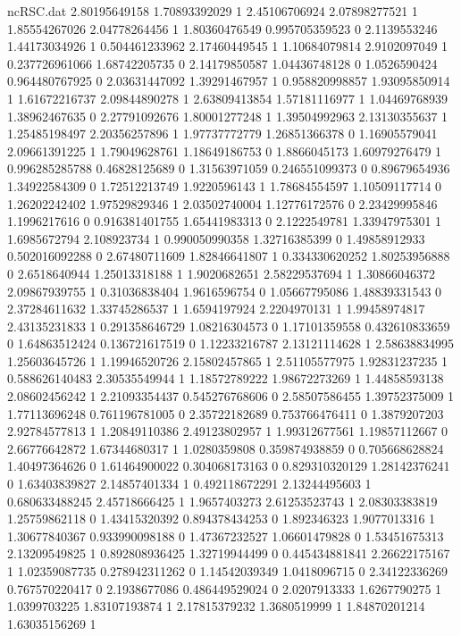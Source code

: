 \begin{filecontents}{ncRSC.dat}
2.80195649158 1.70893392029 1
2.45106706924 2.07898277521 1
1.85554267026 2.04778264456 1
1.80360476549 0.995705359523 0
2.1139553246 1.44173034926 1
0.504461233962 2.17460449545 1
1.10684079814 2.9102097049 1
0.237726961066 1.68742205735 0
2.14179850587 1.04436748128 0
1.0526590424 0.964480767925 0
2.03631447092 1.39291467957 1
0.958820998857 1.93095850914 1
1.61672216737 2.09844890278 1
2.63809413854 1.57181116977 1
1.04469768939 1.38962467635 0
2.27791092676 1.80001277248 1
1.39504992963 2.13130355637 1
1.25485198497 2.20356257896 1
1.97737772779 1.26851366378 0
1.16905579041 2.09661391225 1
1.79049628761 1.18649186753 0
1.8866045173 1.60979276479 1
0.996285285788 0.46828125689 0
1.31563971059 0.246551099373 0
0.89679654936 1.34922584309 0
1.72512213749 1.9220596143 1
1.78684554597 1.10509117714 0
1.26202242402 1.97529829346 1
2.03502740004 1.12776172576 0
2.23429995846 1.1996217616 0
0.916381401755 1.65441983313 0
2.1222549781 1.33947975301 1
1.6985672794 2.108923734 1
0.990050990358 1.32716385399 0
1.49858912933 0.502016092288 0
2.67480711609 1.82846641807 1
0.334330620252 1.80253956888 0
2.6518640944 1.25013318188 1
1.9020682651 2.58229537694 1
1.30866046372 2.09867939755 1
0.31036838404 1.9616596754 0
1.05667795086 1.48839331543 0
2.37284611632 1.33745286537 1
1.6594197924 2.2204970131 1
1.99458974817 2.43135231833 1
0.291358646729 1.08216304573 0
1.17101359558 0.432610833659 0
1.64863512424 0.136721617519 0
1.12233216787 2.13121114628 1
2.58638834995 1.25603645726 1
1.19946520726 2.15802457865 1
2.51105577975 1.92831237235 1
0.588626140483 2.30535549944 1
1.18572789222 1.98672273269 1
1.44858593138 2.08602456242 1
2.21093354437 0.545276768606 0
2.58507586455 1.39752375009 1
1.77113696248 0.761196781005 0
2.35722182689 0.753766476411 0
1.3879207203 2.92784577813 1
1.20849110386 2.49123802957 1
1.99312677561 1.19857112667 0
2.66776642872 1.67344680317 1
1.0280359808 0.359874938859 0
0.705668628824 1.40497364626 0
1.61464900022 0.304068173163 0
0.829310320129 1.28142376241 0
1.63403839827 2.14857401334 1
0.492118672291 2.13244495603 1
0.680633488245 2.45718666425 1
1.9657403273 2.61253523743 1
2.08303383819 1.25759862118 0
1.43415320392 0.894378434253 0
1.892346323 1.9077013316 1
1.30677840367 0.933990098188 0
1.47367232527 1.06601479828 0
1.53451675313 2.13209549825 1
0.892808936425 1.32719944499 0
0.445434881841 2.26622175167 1
1.02359087735 0.278942311262 0
1.14542039349 1.0418096715 0
2.34122336269 0.767570220417 0
2.1938677086 0.486449529024 0
2.0207913333 1.6267790275 1
1.0399703225 1.83107193874 1
2.17815379232 1.3680519999 1
1.84870201214 1.63035156269 1

\end{filecontents}
